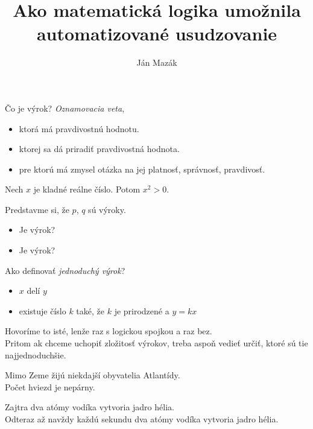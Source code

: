 \documentclass[12pt]{beamer}
\theoremstyle{definition}
\begin{document}
\title{Ako matematická logika umožnila automatizované usudzovanie}
\author{Ján Mazák}
\date{}
\frame{\titlepage}

\begin{frame}
Čo je výrok? \emph{Oznamovacia veta},
\begin{itemize}
	\item ktorá má pravdivostnú hodnotu.
	\item ktorej sa dá priradiť pravdivostná hodnota.
	\item pre ktorú má zmysel otázka na jej platnosť, správnosť, pravdivosť.
\end{itemize}
\end{frame}

\begin{frame}
Nech $x$ je kladné reálne číslo. Potom $x^2 > 0$.
\end{frame}

\begin{frame}
Predstavme si, že $p$, $q$ sú výroky.
\begin{itemize}
	\item Je  výrok?
	\item Je  výrok?
\end{itemize}
\end{frame}

\begin{frame}
Ako definovať \emph{jednoduchý výrok}? 
\begin{itemize}
	\item $x$ delí $y$
	\item existuje číslo $k$ také, že $k$ je prirodzené a $y = kx$
\end{itemize}
\vspace*{3mm}
Hovoríme to isté, lenže raz s logickou spojkou a raz bez.\\[6mm]

Pritom ak chceme uchopiť zložitosť výrokov, treba aspoň vedieť určiť, ktoré sú tie najjednoduchšie.
\end{frame}

\begin{frame}
Mimo Zeme žijú niekdajší obyvatelia Atlantídy.\\[5mm]
Počet hviezd je nepárny.
\end{frame}

\begin{frame}
Zajtra dva atómy vodíka vytvoria jadro hélia.\\[5mm]
\pause
Odteraz až navždy každú sekundu dva atómy vodíka vytvoria jadro hélia.
\end{frame}
\end{document}
